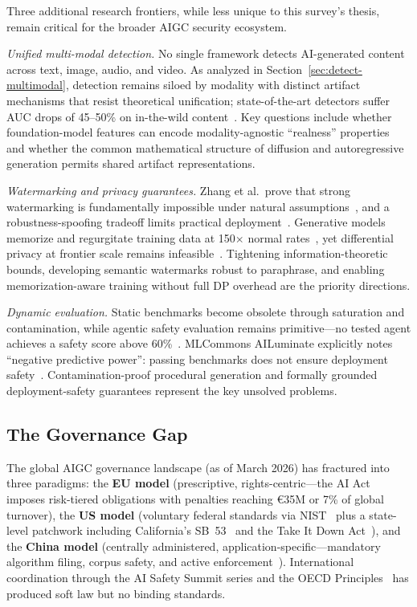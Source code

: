 Three additional research frontiers, while less unique to this survey's thesis, remain critical for the broader AIGC security ecosystem.

\emph{Unified multi-modal detection.} No single framework detects AI-generated content across text, image, audio, and video. As analyzed in Section~\ref{sec:detect-multimodal}, detection remains siloed by modality with distinct artifact mechanisms that resist theoretical unification; state-of-the-art detectors suffer AUC drops of 45--50\% on in-the-wild content~\cite{chandra2025deepfakeeval}. Key questions include whether foundation-model features can encode modality-agnostic ``realness'' properties~\cite{ojha2023univfd} and whether the common mathematical structure of diffusion and autoregressive generation permits shared artifact representations.

\emph{Watermarking and privacy guarantees.} Zhang et al.\ prove that strong watermarking is fundamentally impossible under natural assumptions~\cite{zhang2024impossibility}, and a robustness-spoofing tradeoff limits practical deployment~\cite{pang2024nofree}. Generative models memorize and regurgitate training data at 150$\times$ normal rates~\cite{nasr2025extraction}, yet differential privacy at frontier scale remains infeasible~\cite{tramer2024dpposition}. Tightening information-theoretic bounds, developing semantic watermarks robust to paraphrase, and enabling memorization-aware training without full DP overhead are the priority directions.

\emph{Dynamic evaluation.} Static benchmarks become obsolete through saturation and contamination, while agentic safety evaluation remains primitive---no tested agent achieves a safety score above 60\%~\cite{zhang2024agentsafetybench}. MLCommons AILuminate explicitly notes ``negative predictive power'': passing benchmarks does not ensure deployment safety~\cite{ghosh2024ailuminate}. Contamination-proof procedural generation and formally grounded deployment-safety guarantees represent the key unsolved problems.


\subsection{The Governance Gap}
\label{sec:governance}

The global AIGC governance landscape (as of March 2026) has fractured into three paradigms: the \textbf{EU model} (prescriptive, rights-centric---the AI Act~\cite{euaiact2024} imposes risk-tiered obligations with penalties reaching \euro35M or 7\% of global turnover), the \textbf{US model} (voluntary federal standards via NIST~\cite{nistrmf} plus a state-level patchwork including California's SB~53~\cite{casb53} and the Take It Down Act~\cite{takeitdown2025}), and the \textbf{China model} (centrally administered, application-specific---mandatory algorithm filing, corpus safety, and active enforcement~\cite{chinainterim2023}). International coordination through the AI Safety Summit series and the OECD Principles~\cite{oecdai2024} has produced soft law but no binding standards.

